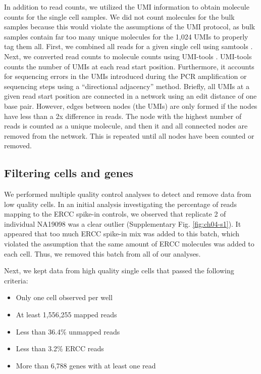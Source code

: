 In addition to read counts, we utilized the UMI information to obtain
molecule counts for the single cell samples. We did not count
molecules for the bulk samples because this would violate the
assumptions of the UMI protocol, as bulk samples contain far too many
unique molecules for the 1,024 UMIs to properly tag them all. First,
we combined all reads for a given single cell using samtools
\citep{Li2009}. Next, we converted read counts to molecule counts
using UMI-tools \citep{Smith2016}.  UMI-tools counts the number of
UMIs at each read start position.  Furthermore, it accounts for
sequencing errors in the UMIs introduced during the PCR amplification
or sequencing steps using a ``directional adjacency'' method. Briefly,
all UMIs at a given read start position are connected in a network
using an edit distance of one base pair. However, edges between nodes
(the UMIs) are only formed if the nodes have less than a 2x difference
in reads. The node with the highest number of reads is counted as a
unique molecule, and then it and all connected nodes are removed from
the network. This is repeated until all nodes have been counted or
removed.

\subsection{Filtering cells and
genes}\label{filtering-cells-and-genes}

We performed multiple quality control analyses to detect and remove
data from low quality cells. In an initial analysis investigating the
percentage of reads mapping to the ERCC spike-in controls, we observed
that replicate 2 of individual NA19098 was a clear outlier
(Supplementary Fig. \ref{fig:ch04-s1}). It appeared that too much ERCC
spike-in mix was added to this batch, which violated the assumption
that the same amount of ERCC molecules was added to each cell. Thus,
we removed this batch from all of our analyses.

Next, we kept data from high quality single cells that passed the
following criteria:

\begin{itemize}
\itemsep1pt\parskip0pt
\item
  Only one cell observed per well
\item
  At least 1,556,255 mapped reads
\item
  Less than 36.4\% unmapped reads
\item
  Less than 3.2\% ERCC reads
\item
  More than 6,788 genes with at least one read
\end{itemize}


